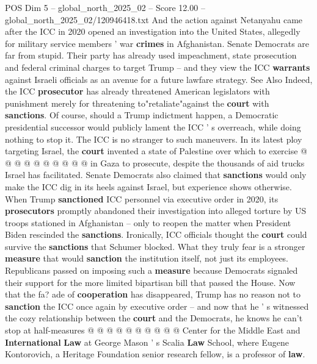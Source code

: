 \begin{textsample}{POS Dim 5 – global\_north\_2025\_02 – Score 12.00 – global\_north\_2025\_02/120946418.txt}
And the action against Netanyahu came after the ICC in 2020 opened an investigation into the United States, allegedly for military service members ' war \textbf{crimes} in Afghanistan.
Senate Democrats are far from stupid.
Their party has already used impeachment, state prosecution and federal criminal charges to target Trump -- and they view the ICC \textbf{warrants} against Israeli officials as an avenue for a future lawfare strategy.
See Also Indeed, the ICC \textbf{prosecutor} has already threatened American legislators with punishment merely for threatening to"retaliate"against the \textbf{court} with \textbf{sanctions}.
Of course, should a Trump indictment happen, a Democratic presidential successor would publicly lament the ICC ' s overreach, while doing nothing to stop it.
The ICC is no stranger to such maneuvers.
In its latest ploy targeting Israel, the \textbf{court} invented a state of Palestine over which to exercise @ @ @ @ @ @ @ @ @ @ in Gaza to prosecute, despite the thousands of aid trucks Israel has facilitated.
Senate Democrats also claimed that \textbf{sanctions} would only make the ICC dig in its heels against Israel, but experience shows otherwise.
When Trump \textbf{sanctioned} ICC personnel via executive order in 2020, its \textbf{prosecutors} promptly abandoned their investigation into alleged torture by US troops stationed in Afghanistan -- only to reopen the matter when President Biden rescinded the \textbf{sanctions}.
Ironically, ICC officials thought the \textbf{court} could survive the \textbf{sanctions} that Schumer blocked.
What they truly fear is a stronger \textbf{measure} that would \textbf{sanction} the institution itself, not just its employees.
Republicans passed on imposing such a \textbf{measure} because Democrats signaled their support for the more limited bipartisan bill that passed the House.
Now that the fa? ade of \textbf{cooperation} has disappeared, Trump has no reason not to \textbf{sanction} the ICC once again by executive order -- and now that he ' s witnessed the cozy relationship between the \textbf{court} and the Democrats, he knows he can't stop at half-measures @ @ @ @ @ @ @ @ @ @ Center for the Middle East and \textbf{International} \textbf{Law} at George Mason ' s Scalia \textbf{Law} School, where Eugene Kontorovich, a Heritage Foundation senior research fellow, is a professor of \textbf{law}.

\end{textsample}
